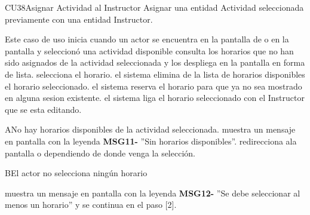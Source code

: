 \begin{UseCase}{CU38}{Asignar Actividad al Instructor}{
	Asignar una entidad Actividad seleccionada previamente con una entidad Instructor.
	}
	
\end{UseCase}
\begin{UCtrayectoria}{Este caso de uso inicia cuando un actor se encuentra en la pantalla de  o en la pantalla   y seleccionó una actividad disponible}
	\UCpaso consulta los horarios que no han sido asignados de la actividad seleccionada y los despliega en la pantalla en forma de lista.
	\UCpaso[\UCactor] selecciona el horario.
	\UCpaso el sistema elimina de la lista de horarios disponibles el horario seleccionado.
	\UCpaso el sistema reserva el horario para que ya no sea mostrado en alguna sesion existente.
	\UCpaso el sistema liga el horario seleccionado con el Instructor que se esta editando.
\end{UCtrayectoria}

\begin{UCtrayectoriaA}{A}{No hay horarios disponibles de la actividad seleccionada.}
	\UCpaso muestra un mensaje en pantalla con la leyenda {\bf MSG11-} ''Sin horarios disponibles''.
	\UCpaso redirecciona ala pantalla  o   dependiendo de donde venga la selección.
\end{UCtrayectoriaA}
\begin{UCtrayectoriaA}{B}{El actor no selecciona ningún horario}

	\UCpaso muestra un mensaje en pantalla con la leyenda {\bf MSG12-} ''Se debe seleccionar al menos un horario'' y se continua en el paso [2].
\end{UCtrayectoriaA}


